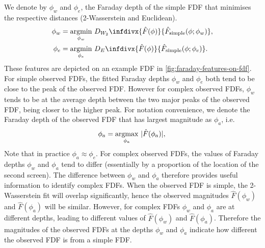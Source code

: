     We denote by $\phi_w$ and $\phi_e$, the Faraday depth of the simple FDF that minimises the respective distances
    (2-Wasserstein and Euclidean).
    \begin{align*}
       \phi_w &= \underset{\phi_w}{\mathrm{argmin}}\ D_{W_2}\infdivx{\hat F(\phi)}{\hat F_{\mathrm{simple}}(\phi; \phi_w)},\\
       \phi_e &= \underset{\phi_e}{\mathrm{argmin}}\ D_E\infdivx{\hat F(\phi)}{\hat F_{\mathrm{simple}}(\phi; \phi_e)}.
     \end{align*}
     These features are depicted on an example FDF in \autoref{fig:faraday-features-on-fdf}.
     For simple observed FDFs, the fitted Faraday depths $\phi_w$ and $\phi_e$ both tend to be
     close to the peak of the observed FDF. However for complex observed FDFs, $\phi_w$ tends
     to be at the average depth between the two major peaks of the observed FDF, being closer
     to the higher peak. For notation convenience, we denote the Faraday depth of the
     observed FDF that has largest magnitude as $\phi_a$, i.e.
     \begin{equation*}
       \phi_a = \underset{\phi_a}{\mathrm{argmax}}\ |\hat F(\phi_a)|,\\
     \end{equation*}
     Note that in practice $\phi_a \approx \phi_e$.
     For complex observed FDFs, the values of Faraday depths $\phi_w$ and $\phi_a$ tend
     to differ (essentially by a proportion of the location of the second screen).
     The difference between $\phi_w$ and $\phi_a$ therefore provides useful information
     to identify complex FDFs.
     When the observed FDF is simple, the 2-Wasserstein fit will overlap significantly,
     hence the observed magnitudes $\hat F(\phi_w)$ and $\hat F(\phi_a)$ will be similar.
     However, for complex FDFs $\phi_w$ and $\phi_a$ are at different depths,
     leading to different values of $\hat F(\phi_w)$ and $\hat F(\phi_a)$.
     Therefore the magnitudes of the observed FDFs at the depths $\phi_w$ and $\phi_a$
     indicate how different the observed FDF is from a simple FDF.

